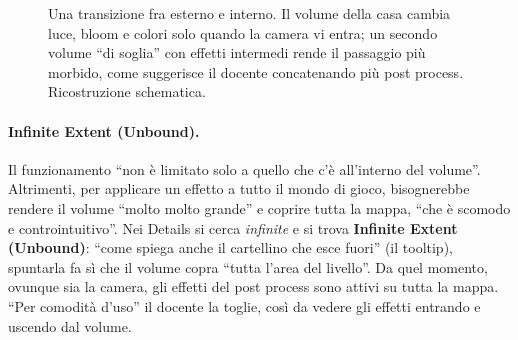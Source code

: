 \begin{figure}[htbp]
\centering
{}
\caption{Una transizione fra esterno e interno. Il volume della casa cambia luce, bloom e
colori solo quando la camera vi entra; un secondo volume ``di soglia'' con effetti
intermedi rende il passaggio più morbido, come suggerisce il docente concatenando più post
process. Ricostruzione schematica.}
\label{ue16:fig:transizione}
\end{figure}

\paragraph{Infinite Extent (Unbound).} Il funzionamento ``non è limitato solo a quello che c'è
all'interno del volume''. Altrimenti, per applicare un effetto a tutto il mondo di gioco,
bisognerebbe rendere il volume ``molto molto grande'' e coprire tutta la mappa, ``che è scomodo
e controintuitivo''. Nei Details si cerca \emph{infinite} e si trova \textbf{Infinite Extent
(Unbound)}: ``come spiega anche il cartellino che esce fuori'' (il tooltip), spuntarla fa sì
che il volume copra ``tutta l'area del livello''. Da quel momento, ovunque sia la camera, gli
effetti del post process sono attivi su tutta la mappa. ``Per comodità d'uso'' il docente la
toglie, così da vedere gli effetti entrando e uscendo dal volume.

